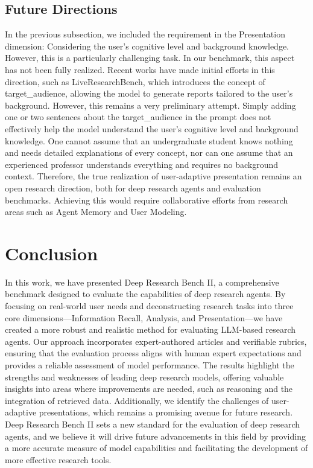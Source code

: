 \documentclass[11pt]{article}
\begin{document}
\subsection{Future Directions}

In the previous subsection, we included the requirement in the Presentation dimension: Considering the user's cognitive level and background knowledge. However, this is a particularly challenging task. In our benchmark, this aspect has not been fully realized. Recent works have made initial efforts in this direction, such as LiveResearchBench, which introduces the concept of target\_audience, allowing the model to generate reports tailored to the user's background. However, this remains a very preliminary attempt. Simply adding one or two sentences about the target\_audience in the prompt does not effectively help the model understand the user's cognitive level and background knowledge. One cannot assume that an undergraduate student knows nothing and needs detailed explanations of every concept, nor can one assume that an experienced professor understands everything and requires no background context. Therefore, the true realization of user-adaptive presentation remains an open research direction, both for deep research agents and evaluation benchmarks. Achieving this would require collaborative efforts from research areas such as Agent Memory and User Modeling.

\section{Conclusion}
In this work, we have presented Deep Research Bench II, a comprehensive benchmark designed to evaluate the capabilities of deep research agents. By focusing on real-world user needs and deconstructing research tasks into three core dimensions---Information Recall, Analysis, and Presentation---we have created a more robust and realistic method for evaluating LLM-based research agents. Our approach incorporates expert-authored articles and verifiable rubrics, ensuring that the evaluation process aligns with human expert expectations and provides a reliable assessment of model performance. The results highlight the strengths and weaknesses of leading deep research models, offering valuable insights into areas where improvements are needed, such as reasoning and the integration of retrieved data. Additionally, we identify the challenges of user-adaptive presentations, which remains a promising avenue for future research. Deep Research Bench II sets a new standard for the evaluation of deep research agents, and we believe it will drive future advancements in this field by providing a more accurate measure of model capabilities and facilitating the development of more effective research tools.
\end{document}
